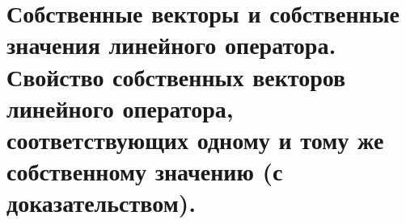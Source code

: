 \section{
    Собственные векторы и собственные значения линейного оператора. Свойство собственных векторов линейного оператора, соответствующих одному и тому же собственному значению (с доказательством).
}


